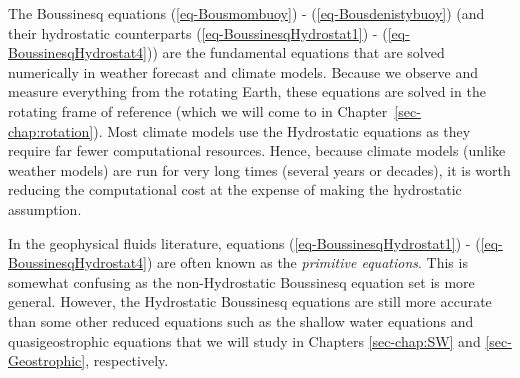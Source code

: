 \documentclass[
  letterpaper,
  twocolumn,
  landscape]{report}
\begin{document}
\begin{tcolorbox}[enhanced jigsaw, toprule=.15mm, left=2mm, opacityback=0, breakable, arc=.35mm, colback=white, rightrule=.15mm, bottomrule=.15mm, colframe=quarto-callout-note-color-frame, leftrule=.75mm]
\begin{minipage}[t]{5.5mm}
\textcolor{quarto-callout-note-color}{\faInfo}
\end{minipage}%
\begin{minipage}[t]{\textwidth - 5.5mm}

The Boussinesq equations (\ref{eq-Bousmombuoy}) -
(\ref{eq-Bousdenistybuoy}) (and their hydrostatic counterparts
(\ref{eq-BoussinesqHydrostat1}) - (\ref{eq-BoussinesqHydrostat4})) are
the fundamental equations that are solved numerically in weather
forecast and climate models. Because we observe and measure everything
from the rotating Earth, these equations are solved in the rotating
frame of reference (which we will come to in
Chapter~\ref{sec-chap:rotation}). Most climate models use the
Hydrostatic equations as they require far fewer computational resources.
Hence, because climate models (unlike weather models) are run for very
long times (several years or decades), it is worth reducing the
computational cost at the expense of making the hydrostatic assumption.

\end{minipage}%
\end{tcolorbox}

\begin{tcolorbox}[enhanced jigsaw, toprule=.15mm, left=2mm, opacityback=0, breakable, arc=.35mm, colback=white, rightrule=.15mm, bottomrule=.15mm, colframe=quarto-callout-note-color-frame, leftrule=.75mm]
\begin{minipage}[t]{5.5mm}
\textcolor{quarto-callout-note-color}{\faInfo}
\end{minipage}%
\begin{minipage}[t]{\textwidth - 5.5mm}

In the geophysical fluids literature, equations
(\ref{eq-BoussinesqHydrostat1}) - (\ref{eq-BoussinesqHydrostat4}) are
often known as the \emph{primitive equations}. This is somewhat
confusing as the non-Hydrostatic Boussinesq equation set is more
general. However, the Hydrostatic Boussinesq equations are still more
accurate than some other reduced equations such as the shallow water
equations and quasigeostrophic equations that we will study in Chapters
\ref{sec-chap:SW} and \ref{sec-Geostrophic}, respectively.

\end{minipage}%
\end{tcolorbox}
\end{document}
